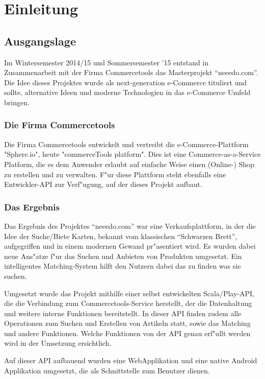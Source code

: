 \section{Einleitung}
\subsection{Ausgangslage}

Im Wintersemester 2014/15 und Sommersemester '15 entstand in Zusammenarbeit mit der Firma Commercetools das Masterprojekt \enquote{neeedo.com}. 
Die Idee dieses Projektes wurde als next-generation e-Commerce tituliert und sollte, alternative Ideen und moderne Technologien in das e-Commerce Umfeld bringen. 

\subsubsection{Die Firma Commercetools}  

Die Firma Commercetools entwickelt und vertreibt die e-Commerce-Plattform "Sphere.io", heute "commerceTools platform". Dies ist eine Commerce-as-a-Service Platform, die es dem Anwender erlaubt auf einfache Weise einen (Online-) Shop zu erstellen und zu verwalten. F"ur diese Plattform steht ebenfalls eine Entwickler-API zur Verf"ugung, auf der dieses Projekt aufbaut.

\subsubsection{Das Ergebnis}

Das Ergebnis des Projektes \enquote{neeedo.com} war eine Verkaufsplattform, in der die Idee der Suche/Biete Karten, bekannt vom klassischen \enquote{Schwarzen Brett}, aufgegriffen und in einem modernen Gewand pr"asentiert wird. 
Es wurden dabei neue Ans"atze f"ur das Suchen und Anbieten von Produkten umgesetzt. Ein intelligentes Matching-System hilft den Nutzern dabei das zu finden was sie suchen.

Umgesetzt wurde das Projekt mithilfe einer selbst entwickelten Scala/Play-API, die die Verbindung zum Commercetools-Service herstellt, der die Datenhaltung und weitere interne Funktionen bereitstellt. 
In dieser API finden zudem alle Operationen zum Suchen und Erstellen von Artikeln statt, sowie das Matching und andere Funktionen. 
Welche Funktionen von der API genau erf"ullt werden wird in der Umsetzung ersichtlich.

Auf dieser API aufbauend wurden eine WebApplikation und eine native Android Applikation umgesetzt, die als Schnittstelle zum Benutzer dienen. 

